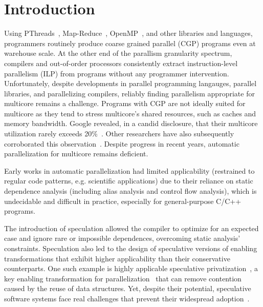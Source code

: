 \section{Introduction}

Using PThreads~\cite{pthread:web}, Map-Reduce~\cite{dean:08:cacm},
OpenMP~\cite{openmp:web}, and other libraries and languages,
programmers routinely produce coarse grained parallel (CGP) programs
even at warehouse scale.  At the other end of the parallism
granularity spectrum, compilers and out-of-order processors
consistently extract instruction-level parallelism (ILP) from programs
without any programmer intervention.  Unfortunately, despite
developments in parallel programming langauges, parallel libraries,
and parallelizing compilers, reliably finding parallelism appropriate
for multicore remains a challenge.  Programs with CGP are not ideally
suited for multicore as they tend to stress multicore's shared
resources, such as caches and memory bandwidth.  Google revealed, in a
candid disclosure,
that their multicore utilization rarely exceeds
20\%~\cite{barroso:07:computer}. Other researchers have also
subsequently corroborated this observation~\cite{chung:13:isca}.
Despite progress in recent years, automatic parallelization for
multicore remains deficient.

Early works in automatic parallelization had limited applicability
(restrained to regular code patterns, e.g. scientific applications)
due to their reliance on static dependence analysis (including alias
analysis and control flow analysis), which is undecidable and
difficult in practice, especially for general-purpose C/C++ programs.

The introduction of speculation allowed the compiler to optimize for
an expected case and ignore rare or impossible dependences, overcoming
static analysis' constraints.  Speculation also led to the design of
speculative versions of enabling transformations that exhibit higher
applicability than their conservative counterparts.  One such example
is highly applicable speculative privatization~\cite{johnson:12:pldi},
a key enabling transformation for
parallelization~\cite{citations_from_privateer} that can remove
contention caused by the reuse of data structures.
%
%
Yet, despite their potential, speculative software systems face real
challenges that prevent their widespread
adoption~\cite{cascaval:08:stmtoy:short, .., ..}.


